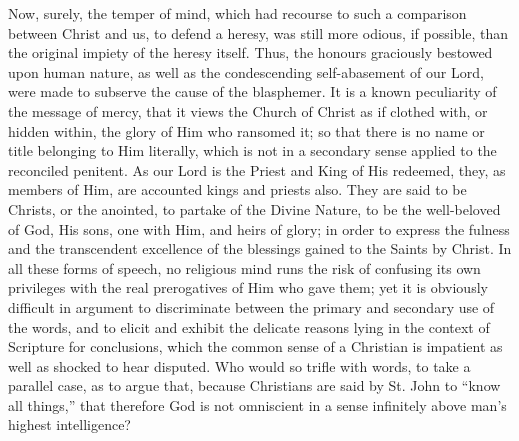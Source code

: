 Now, surely, the temper of mind, which had recourse to such a
comparison between Christ and us, to defend a heresy, was still more
odious, if possible, than the original impiety of the heresy itself.
Thus, the honours graciously bestowed upon human nature, as well as
the condescending self-abasement of our Lord, were made to subserve
the cause of the blasphemer. It is a known peculiarity of the message
of mercy, that it views the Church of Christ as if clothed with, or
hidden within, the glory of Him who ransomed it; so that there is no
name or title belonging to Him literally, which is not in a secondary
sense applied to the reconciled penitent. As our Lord is the
Priest and King of His redeemed, they, as members of Him, are
accounted kings and priests also. They are said to be Christs, or the
anointed, to partake of the Divine Nature, to be the well-beloved of
God, His sons, one with Him, and heirs of glory; in order to express
the fulness and the transcendent excellence of the blessings gained to
the Saints by Christ. In all these forms of speech, no religious mind
runs the risk of confusing its own privileges with the real
prerogatives of Him who gave them; yet it is obviously difficult in
argument to discriminate between the primary and secondary use of the
words, and to elicit and exhibit the delicate reasons lying in the
context of Scripture for conclusions, which the common sense of a
Christian is impatient as well as shocked to hear disputed. Who would
so trifle with words, to take a parallel case, as to argue that,
because Christians are said by St. John to ``know all
things,'' that therefore God is not omniscient in a sense
infinitely above man's highest intelligence?

